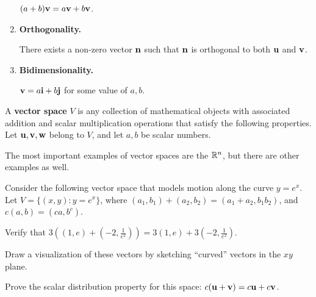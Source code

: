 \begin{applicationActivities}{1}{7}
\begin{activity}{25}
\begin{multicols}{2}
\begin{enumerate}
        \((a+b)\mathbf v=a\mathbf v+b\mathbf v\).
  \item \textbf{Orthogonality.}

        There exists a non-zero vector \(\mathbf n\) such that
        \(\mathbf n\) is orthogonal to both \(\mathbf u\) and \(\mathbf v\).
  \item \textbf{Bidimensionality.}

        \(\mathbf v=a\mathbf i+b\mathbf j\) for some value of \(a,b\).
\end{enumerate}
\end{multicols}
\end{activity}

\begin{definition}
  A \textbf{vector space} \(V\) is any collection of mathematical objects with
  associated addition and scalar multiplication operations that satisfy
  the following properties. Let \(\mathbf u,\mathbf v,\mathbf w\) belong to \(V\),
  and let \(a,b\) be scalar numbers.

  \vectorSpaceProperties
\end{definition}

\begin{definition}
  The most important examples of vector spaces are the  \(\mathbb{R}^n\), but there are other examples as well.
\end{definition}

\begin{activity}{25}
  Consider the following vector space that models motion along the curve
  \(y=e^x\). Let \(V=\{(x,y):y=e^x\}\), where
  \((a_1,b_1)+(a_2,b_2)=(a_1+a_2,b_1b_2)\), and \(c(a,b)=(ca,b^c)\).

  \begin{subactivity}
    Verify that \(3((1,e)+(-2,\frac{1}{e^2}))=
    3(1,e)+3(-2,\frac{1}{e^2})\).
  \end{subactivity}

  \begin{TBLnote}
    Draw a visualization of these vectors by sketching ``curved''
    vectors in the \(xy\) plane.
  \end{TBLnote}

  \begin{subactivity}
    Prove the scalar distribution property for this space:
    \(c(\mathbf u+\mathbf v)=c\mathbf u+c\mathbf v\).
  \end{subactivity}
\end{activity}



\end{applicationActivities}
